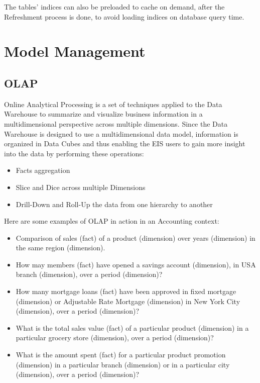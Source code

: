 The tables’ indices can also be preloaded to cache on demand, after the
Refreshment process is done, to avoid loading indices on database query
time\cite{dw:mysql:boss}.

\section{Model Management}

\subsection{OLAP}

Online Analytical Processing is a set of techniques applied to the Data
Warehouse to summarize and visualize business information in a multidimensional
perspective across multiple dimensions. Since the Data Warehouse is designed to
use a multidimensional data model, information is organized in Data Cubes and
thus enabling the EIS users to gain more insight into the data by performing
these operations:

\begin{itemize}
  \item Facts aggregation
  \item Slice and Dice across multiple Dimensions
  \item Drill-Down and Roll-Up the data from one hierarchy to another
\end{itemize}

Here are some examples of OLAP in action in an Accounting
context\cite{site:lbi}:

\begin{itemize}
  \item Comparison of sales (fact) of a product (dimension) over years
  (dimension) in the same region (dimension).
  \item How may members (fact) have opened a savings account (dimension), in USA
  branch (dimension), over a period (dimension)?
  \item How many mortgage loans (fact) have been approved in fixed mortgage
  (dimension) or Adjustable Rate Mortgage (dimension) in New York City
  (dimension), over a period (dimension)?
  \item What is the total sales value (fact) of a particular product (dimension)
  in a particular grocery store (dimension), over a period (dimension)?
  \item What is the amount spent (fact) for a particular product promotion
  (dimension) in a particular branch (dimension) or in a particular city
  (dimension), over a period (dimension)?
\end{itemize}

